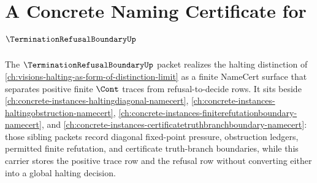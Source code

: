 \chapter{A Concrete Naming Certificate for $\TerminationRefusalBoundaryUp$}
\label{ch:concrete-instances-terminationrefusalboundary-namecert}

The $\TerminationRefusalBoundaryUp$ packet realizes the halting distinction of \autoref{ch:visions-halting-as-form-of-distinction-limit} as a finite NameCert surface that separates positive finite $\Cont$ traces from refusal-to-decide rows. It sits beside \autoref{ch:concrete-instances-haltingdiagonal-namecert}, \autoref{ch:concrete-instances-haltingobstruction-namecert}, \autoref{ch:concrete-instances-finiterefutationboundary-namecert}, and \autoref{ch:concrete-instances-certificatetruthbranchboundary-namecert}: those sibling packets record diagonal fixed-point pressure, obstruction ledgers, permitted finite refutation, and certificate truth-branch boundaries, while this carrier stores the positive trace row and the refusal row without converting either into a global halting decision.

